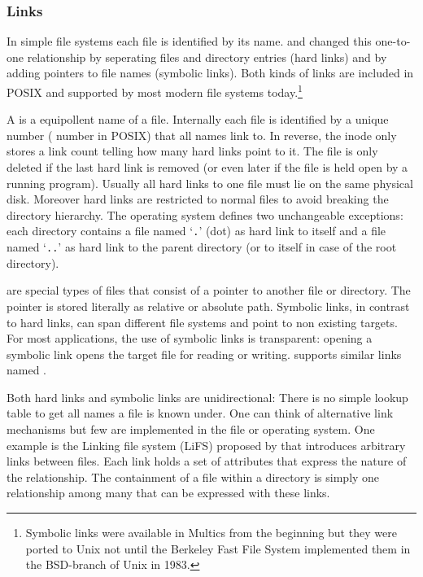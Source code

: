\subsubsection{Links}
\label{sec:symlinks}

In simple file systems each file is identified by its name.  and
 changed this one-to-one relationship by seperating files and
directory entries (hard links) and by adding pointers to file names (symbolic
links). Both kinds of links are included in POSIX and supported by most modern
file systems today.\footnote{Symbolic links were available in Multics from the
beginning but they were ported to Unix not until the Berkeley Fast File System
implemented them in the BSD-branch of Unix in 1983.}

A  is a equipollent name of a file. Internally each file is identified
by a unique number ( number in POSIX) that all names link to. In
reverse, the inode only stores a link count telling how many hard links point to
it. The file is only deleted if the last hard link is removed (or even later if
the file is held open by a running program). Usually all hard links to one file
must lie on the same physical disk. Moreover hard links are restricted to normal files
to avoid breaking the directory hierarchy. The operating system defines two
unchangeable exceptions: each directory contains a file named `\verb|.|' (dot) as
hard link to itself and a file named `\verb|..|' as hard link to the parent
directory (or to itself in case of the root directory).

 are special types of files that consist of
a pointer to another file or directory. The pointer is stored literally as
relative or absolute path.  Symbolic links, in contrast to hard links, can 
span different file systems and point to non existing targets. For most
applications, the use of symbolic links is transparent: opening a symbolic link
opens the target file for reading or writing.  supports similar
links named .

Both hard links and symbolic links are unidirectional: There is no simple
lookup table to get all names a file is known under. One can think of
alternative link mechanisms but few are implemented in the file or operating
system. One example is the Linking file system (LiFS) proposed by
\textcite{Amens2005} that introduces arbitrary links between files. Each link
holds a set of attributes that express the nature of the relationship. The
containment of a file within a directory is simply one relationship among many
that can be expressed with these links. 

